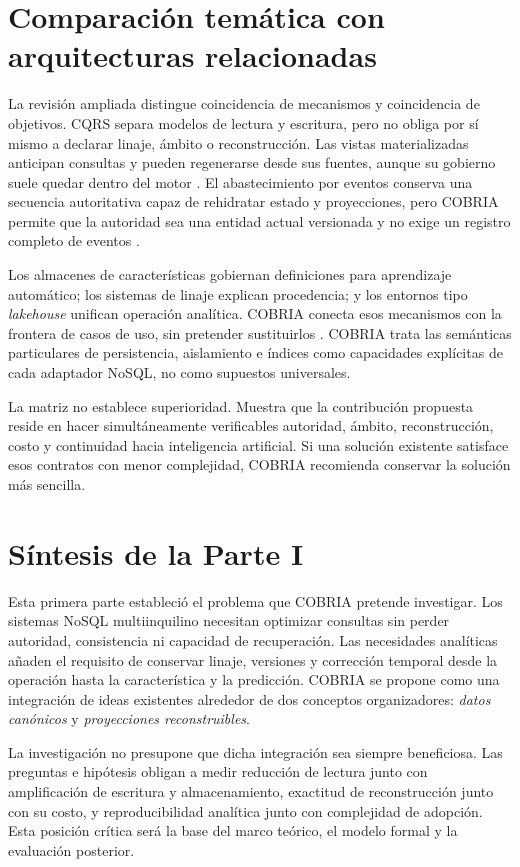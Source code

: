 \section{Comparación temática con arquitecturas relacionadas}

La revisión ampliada distingue coincidencia de mecanismos y coincidencia de objetivos.
CQRS separa modelos de lectura y escritura, pero no obliga por sí mismo a declarar
linaje, ámbito o reconstrucción. Las vistas materializadas anticipan consultas y pueden
regenerarse desde sus fuentes, aunque su gobierno suele quedar dentro del motor
\parencite{microsoft2025cqrs,microsoft2025materialized}.
El abastecimiento por eventos conserva una secuencia autoritativa capaz de rehidratar
estado y proyecciones, pero COBRIA permite que la autoridad sea una entidad actual
versionada y no exige un registro completo de eventos \parencite{fowler2005eventsourcing}.

Los almacenes de características gobiernan definiciones para aprendizaje automático;
los sistemas de linaje explican procedencia; y los entornos tipo \emph{lakehouse}
unifican operación analítica. COBRIA conecta esos mecanismos con la frontera de casos de
uso, sin pretender sustituirlos \parencite{orr2021featurestores,li2023featurestore,
buneman2001provenance,armbrust2021lakehouse}. COBRIA trata las semánticas particulares
de persistencia, aislamiento e índices como capacidades explícitas de cada adaptador
NoSQL, no como supuestos universales.



La matriz no establece superioridad. Muestra que la contribución propuesta reside en
hacer simultáneamente verificables autoridad, ámbito, reconstrucción, costo y continuidad
hacia inteligencia artificial. Si una solución existente satisface esos contratos con
menor complejidad, COBRIA recomienda conservar la solución más sencilla.

\section{Síntesis de la Parte I}

Esta primera parte estableció el problema que COBRIA pretende investigar. Los sistemas
NoSQL multiinquilino necesitan optimizar consultas sin perder autoridad, consistencia ni
capacidad de recuperación. Las necesidades analíticas añaden el requisito de conservar
linaje, versiones y corrección temporal desde la operación hasta la característica y la
predicción. COBRIA se propone como una integración de ideas existentes alrededor de dos
conceptos organizadores: \emph{datos canónicos} y \emph{proyecciones reconstruibles}.

La investigación no presupone que dicha integración sea siempre beneficiosa. Las
preguntas e hipótesis obligan a medir reducción de lectura junto con amplificación de
escritura y almacenamiento, exactitud de reconstrucción junto con su costo, y
reproducibilidad analítica junto con complejidad de adopción. Esta posición crítica será
la base del marco teórico, el modelo formal y la evaluación posterior.
